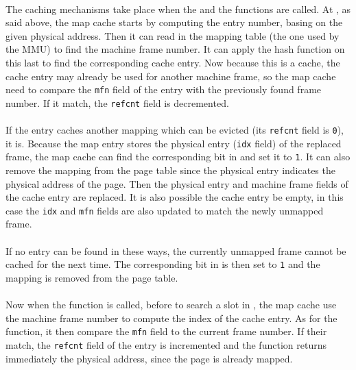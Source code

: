 \paragraph{}
The caching mechanisms take place when the \map and the \unmap functions are
called.
At \unmap, as said above, the map cache starts by computing the entry number,
basing on the given physical address.
Then it can read in the mapping table (the one used by the MMU) to find the
machine frame number.
It can apply the hash function on this last to find the corresponding cache
entry.
Now because this is a cache, the cache entry may already be used for another
machine frame, so the map cache need to compare the \texttt{mfn} field of the
entry with the previously found frame number.
If it match, the \texttt{refcnt} field is decremented.

\paragraph{}
If the entry caches another mapping which can be evicted (its \texttt{refcnt}
field is \texttt{0}), it is.
Because the map entry stores the physical entry (\texttt{idx} field) of the
replaced frame, the map cache can find the corresponding bit in \garbage and
set it to \texttt{1}.
It can also remove the mapping from the page table since the physical entry
indicates the physical address of the page.
Then the physical entry and machine frame fields of the cache entry are
replaced.
It is also possible the cache entry be empty, in this case the \texttt{idx} and
\texttt{mfn} fields are also updated to match the newly unmapped frame.

\paragraph{}
If no entry can be found in these ways, the currently unmapped frame cannot be
cached for the next time.
The corresponding bit in \garbage is then set to \texttt{1} and the mapping is
removed from the page table.

\paragraph{}
Now when the \map function is called, before to search a slot in \inuse, the
map cache use the machine frame number to compute the index of the cache entry.
As for the \unmap function, it then compare the \texttt{mfn} field to the
current frame number.
If their match, the \texttt{refcnt} field of the entry is incremented and the
function returns immediately the physical address, since the page is already
mapped.

